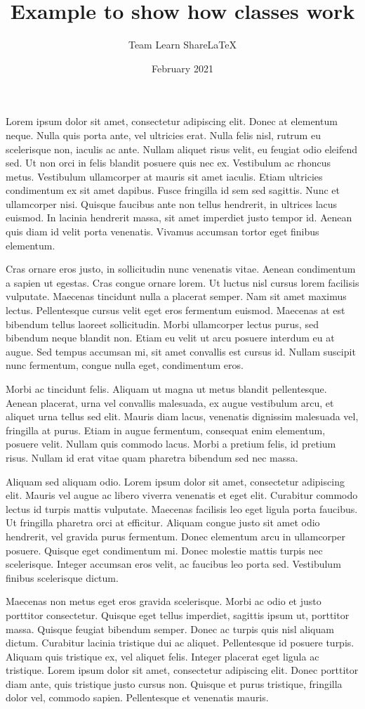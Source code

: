 \documentclass{stucosrec_article}
\title{Example to show how classes work}
\author{Team Learn ShareLaTeX}
\date{February 2021}
\begin{document}
	\maketitle

	Lorem ipsum dolor sit amet, consectetur adipiscing elit. Donec at elementum neque. Nulla quis porta ante, vel ultricies erat. Nulla felis nisl, rutrum eu scelerisque non, iaculis ac ante. Nullam aliquet risus velit, eu feugiat odio eleifend sed. Ut non orci in felis blandit posuere quis nec ex. Vestibulum ac rhoncus metus. Vestibulum ullamcorper at mauris sit amet iaculis. Etiam ultricies condimentum ex sit amet dapibus. Fusce fringilla id sem sed sagittis. Nunc et ullamcorper nisi. Quisque faucibus ante non tellus hendrerit, in ultrices lacus euismod. In lacinia hendrerit massa, sit amet imperdiet justo tempor id. Aenean quis diam id velit porta venenatis. Vivamus accumsan tortor eget finibus elementum.

	Cras ornare eros justo, in sollicitudin nunc venenatis vitae. Aenean condimentum a sapien ut egestas. Cras congue ornare lorem. Ut luctus nisl cursus lorem facilisis vulputate. Maecenas tincidunt nulla a placerat semper. Nam sit amet maximus lectus. Pellentesque cursus velit eget eros fermentum euismod. Maecenas at est bibendum tellus laoreet sollicitudin. Morbi ullamcorper lectus purus, sed bibendum neque blandit non. Etiam eu velit ut arcu posuere interdum eu at augue. Sed tempus accumsan mi, sit amet convallis est cursus id. Nullam suscipit nunc fermentum, congue nulla eget, condimentum eros.

	Morbi ac tincidunt felis. Aliquam ut magna ut metus blandit pellentesque. Aenean placerat, urna vel convallis malesuada, ex augue vestibulum arcu, et aliquet urna tellus sed elit. Mauris diam lacus, venenatis dignissim malesuada vel, fringilla at purus. Etiam in augue fermentum, consequat enim elementum, posuere velit. Nullam quis commodo lacus. Morbi a pretium felis, id pretium risus. Nullam id erat vitae quam pharetra bibendum sed nec massa.

	Aliquam sed aliquam odio. Lorem ipsum dolor sit amet, consectetur adipiscing elit. Mauris vel augue ac libero viverra venenatis et eget elit. Curabitur commodo lectus id turpis mattis vulputate. Maecenas facilisis leo eget ligula porta faucibus. Ut fringilla pharetra orci at efficitur. Aliquam congue justo sit amet odio hendrerit, vel gravida purus fermentum. Donec elementum arcu in ullamcorper posuere. Quisque eget condimentum mi. Donec molestie mattis turpis nec scelerisque. Integer accumsan eros velit, ac faucibus leo porta sed. Vestibulum finibus scelerisque dictum.

	Maecenas non metus eget eros gravida scelerisque. Morbi ac odio et justo porttitor consectetur. Quisque eget tellus imperdiet, sagittis ipsum ut, porttitor massa. Quisque feugiat bibendum semper. Donec ac turpis quis nisl aliquam dictum. Curabitur lacinia tristique dui ac aliquet. Pellentesque id posuere turpis. Aliquam quis tristique ex, vel aliquet felis. Integer placerat eget ligula ac tristique. Lorem ipsum dolor sit amet, consectetur adipiscing elit. Donec porttitor diam ante, quis tristique justo cursus non. Quisque et purus tristique, fringilla dolor vel, commodo sapien. Pellentesque et venenatis mauris. 	
\end{document}
